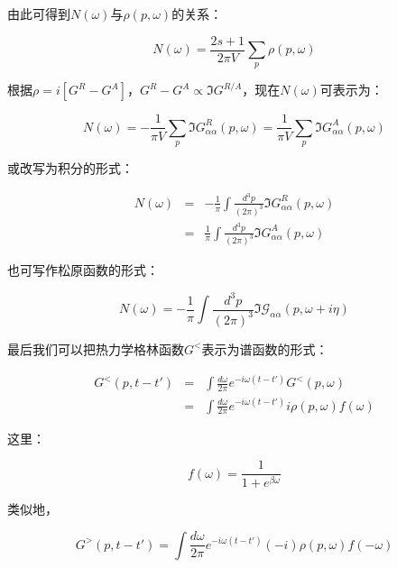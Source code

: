 由此可得到$N(\omega)$与$\rho(p, \omega)$的关系：

\begin{equation}
N(\omega) = \frac{2s + 1}{2 \pi V } \sum\limits_p \rho(p, \omega)
\end{equation}

根据$\rho = i \left[ G^R - G^A \right]$，$G^R - G^A \propto \Im G^{R/A}$，现在$N(\omega )$可表示为：

\begin{equation}
N(\omega ) = - \frac{1}{\pi V} \sum\limits_p \Im G_{\alpha \alpha}^R (p, \omega) = \frac{1}{\pi V} \sum\limits_p \Im G^A_{\alpha \alpha} (p, \omega)
\end{equation}

或改写为积分的形式：

\begin{eqnarray*}
N(\omega ) & = & -\frac{1}{\pi} \int \frac{d^3 p}{(2 \pi)^3 } \Im G^R_{\alpha \alpha} (p, \omega) \\
{} & = & \frac{1 }{\pi } \int \frac{d^3 p}{(2 \pi)^3 } \Im G^A_{\alpha \alpha} (p, \omega)
\end{eqnarray*}

也可写作松原函数的形式：

\begin{equation}
N(\omega ) = - \frac{1}{\pi } \int \frac{d^3 p}{(2 \pi)^3 } \Im \mathcal{G}_{\alpha \alpha} (p, \omega + i \eta)
\end{equation}

最后我们可以把热力学格林函数$G^{<}$表示为谱函数的形式：

\begin{eqnarray*}
G^{<} (p, t-t' )  &=& \int \frac{d \omega }{2 \pi} e^{ - i \omega (t - t' )} G^{<} (p, \omega  ) \\
{} &=& \int \frac{d \omega }{2 \pi} e^{ - i \omega ( t - t' ) } i \rho(p, \omega) f(\omega) 
\end{eqnarray*}

这里：

\begin{equation}
f(\omega ) = \frac{1}{1 + e^{\beta \omega}}
\end{equation}

类似地，

\begin{equation*}
G^{>} (p, t-t' )  =  \int \frac{d \omega }{2 \pi } e^{ - i \omega ( t - t' ) } (-i) \rho(p, \omega) f( - \omega) 
\end{equation*}



